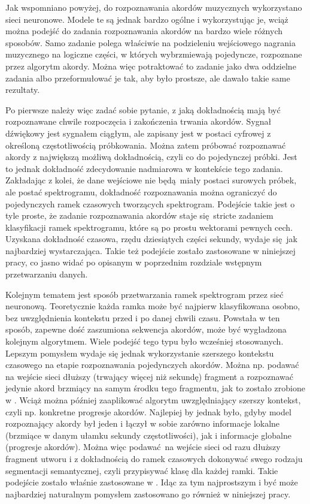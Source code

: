 Jak wspomniano powyżej, do rozpoznawania akordów muzycznych wykorzystano sieci neuronowe. Modele te są jednak bardzo ogólne i wykorzystując je, wciąż można podejść do zadania rozpoznawania akordów na bardzo wiele różnych sposobów. Samo zadanie polega właściwie na podzieleniu wejściowego nagrania muzycznego na logiczne części, w których wybrzmiewają pojedyncze, rozpoznane przez algorytm akordy.  Można więc potraktować to zadanie jako dwa oddzielne zadania albo przeformułować je tak, aby było prostsze, ale dawało takie same rezultaty. 

Po pierwsze należy więc zadać sobie pytanie, z jaką dokładnością mają być rozpoznawane chwile rozpoczęcia i zakończenia trwania akordów. Sygnał dźwiękowy jest sygnałem ciągłym, ale zapisany jest w postaci cyfrowej z określoną częstotliwością próbkowania. Można zatem próbować rozpoznawać akordy z największą możliwą dokładnością, czyli co do pojedynczej próbki. Jest to jednak dokładność zdecydowanie nadmiarowa w kontekście tego zadania. Zakładając z kolei, że dane wejściowe nie będą miały postaci surowych próbek, ale postać spektrogramu, dokładność rozpoznawania można ograniczyć do pojedynczych ramek czasowych tworzących spektrogram. Podejście takie jest o tyle proste, że zadanie rozpoznawania akordów staje się stricte zadaniem klasyfikacji ramek spektrogramu, które są po prostu wektorami pewnych cech. Uzyskana dokładność czasowa, rzędu dziesiątych części sekundy, wydaje się jak najbardziej wystarczająca. Takie też podejście zostało zastosowane w niniejszej pracy, co jasno widać po opisanym w poprzednim rozdziale wstępnym przetwarzaniu danych.

Kolejnym tematem jest sposób przetwarzania ramek spektrogram przez sieć neuronową. Teoretycznie każda ramka może być najpierw klasyfikowana osobno, bez uwzględnienia kontekstu przed i po danej chwili czasu. Powstała w ten sposób, zapewne dość zaszumiona sekwencja akordów, może być wygładzona kolejnym algorytmem. Wiele podejść tego typu było wcześniej stosowanych. Lepszym pomysłem wydaje się jednak wykorzystanie szerszego kontekstu czasowego na etapie rozpoznawania pojedynczych akordów.  Można np.  podawać na wejście sieci dłuższy (trwający więcej niż sekundę) fragment a rozpoznawać jedynie akord brzmiący na samym środku tego fragmentu, jak to zostało zrobione w \cite{korzeniowski_fully_2016}.  Wciąż można później zaaplikować algorytm uwzględniający szerszy kontekst, czyli np. konkretne progresje akordów. Najlepiej by jednak było, gdyby model rozpoznający akordy był jeden i łączył w sobie zarówno informacje lokalne (brzmiące w danym ułamku sekundy częstotliwości), jak i informacje globalne (progresje akordów). Można więc podawać na wejście sieci od razu dłuższy fragment utworu i z dokładnością do ramek czasowych dokonywać swego rodzaju segmentacji semantycznej, czyli przypisywać klasę dla każdej ramki. Takie podejście zostało właśnie zastosowane w \cite{park_bi-directional_2019}. Idąc za tym najprostszym i być może najbardziej naturalnym pomysłem zastosowano go również w niniejszej pracy. 



